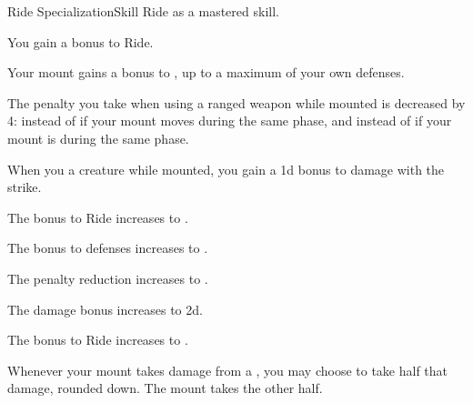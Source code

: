     \begin{feat}{Ride Specialization}{Skill}
        \featpre Ride as a mastered skill.
        \featben

         You gain a  bonus to Ride.

         Your mount gains a  bonus to , up to a maximum of your own defenses.

         The penalty you take when using a ranged weapon while mounted is decreased by 4:  instead of  if your mount moves during the same phase, and  instead of  if your mount is  during the same phase.

         When you  a creature while mounted, you gain a \plus1d bonus to damage with the strike.

         The bonus to Ride increases to .

         The bonus to defenses increases to .

         The penalty reduction increases to .

         The damage bonus increases to \plus2d.

         The bonus to Ride increases to .

         Whenever your mount takes damage from a , you may choose to take half that damage, rounded down.
        The mount takes the other half.
    \end{feat}


